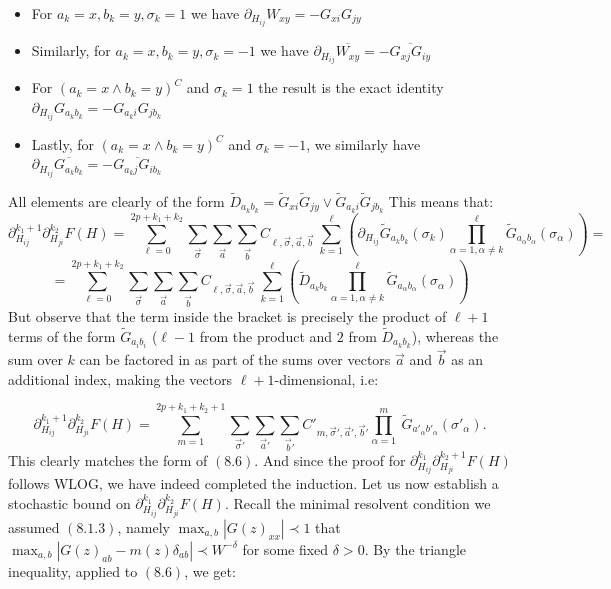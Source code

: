 \documentclass[11pt]{article}
\begin{document}
\begin{itemize}

\item For $a_k=x, b_k=y, \sigma_k=1$ we have $\partial_{H_{ij}} W_{xy} = -G_{xi}G_{jy}$

\item Similarly, for $a_k=x, b_k=y, \sigma_k=-1$ we have $\partial_{H_{ij}} \overline{W_{xy}} = -\overline{G_{xj}G_{iy}}$

\item For $(a_k=x\wedge b_k=y)^C$ and $\sigma_k = 1$ the result is the exact identity $\partial_{H_{ij}} G_{a_k b_k} = -G_{a_k i}G_{j b_k}$

\item Lastly, for $(a_k=x\wedge b_k=y)^C$ and $\sigma_k=-1$, we similarly have $\partial_{H_{ij}} \overline{G_{a_k b_k}} = -\overline{G_{a_k j}G_{i b_k}}$
\end{itemize}
All elements are clearly of the form $\tilde{D}_{a_k b_k} = \tilde{G}_{xi}\tilde{G}_{jy}\vee \tilde{G}_{a_k i}\tilde{G}_{j b_k}$ This means that:
$$\partial_{H_{ij}}^{k_1+1}\partial_{H_{ji}}^{k_2} F(H) = \sum_{\ell=0}^{2p+k_1+k_2} \sum_{\vec\sigma}\sum_{\vec a}\sum_{\vec b}C_{\ell, \vec \sigma, \vec a, \vec b}\ \sum_{k=1}^\ell \left(\partial_{H_{ij}} \tilde{G}_{a_k b_k}(\sigma_k) \prod_{\alpha=1,\alpha\neq k}^\ell \tilde{G}_{a_\alpha b_\alpha}(\sigma_\alpha)\right) = $$
$$ = \sum_{\ell=0}^{2p+k_1+k_2} \sum_{\vec\sigma}\sum_{\vec a}\sum_{\vec b}C_{\ell, \vec \sigma, \vec a, \vec b}\ \sum_{k=1}^\ell \left(\tilde{D}_{a_k b_k} \prod_{\alpha=1,\alpha\neq k}^\ell \tilde{G}_{a_\alpha b_\alpha}(\sigma_\alpha)\right)$$
But observe that the term inside the bracket is precisely the product of $\ell+1$ terms of the form $\tilde G_{a_ib_i}$ ($\ell-1$ from the product and $2$ from $\tilde{D}_{a_kb_k}$), whereas the sum over $k$ can be factored in as part of the sums over vectors $\vec a$ and $\vec b$ as an additional index, making the vectors $\ell+1$-dimensional, i.e: 

$$\partial_{H_{ij}}^{k_1+1}\partial_{H_{ji}}^{k_2} F(H) = \sum_{m=1}^{2p+k_1+k_2+1} \sum_{\vec\sigma'}\sum_{\vec a'}\sum_{\vec b'} C'_{m, \vec\sigma', \vec a', \vec b'} \prod_{\alpha=1}^m\ \tilde{G}_{a'_\alpha b'_\alpha}(\sigma'_\alpha).$$
 This clearly matches the form of $(8.6)$. And since the proof for $\partial_{H_{ij}}^{k_1}\partial_{H_{ji}}^{k_2+1} F(H)$ follows WLOG, we have indeed completed the induction. Let us now establish a stochastic bound on $\partial_{H_{ij}}^{k_1}\partial_{H_{ji}}^{k_2} F(H)$. Recall the minimal resolvent condition we assumed $(8.1.3)$, namely $\max_{a, b}|G(z)_{xx}|\prec 1$ that $\max_{a, b}|G(z)_{ab}-m(z)\delta_{ab}|\prec W^{-\delta}$ for some fixed $\delta>0$. By the triangle inequality, applied to $(8.6)$, we get: 
\end{document}

